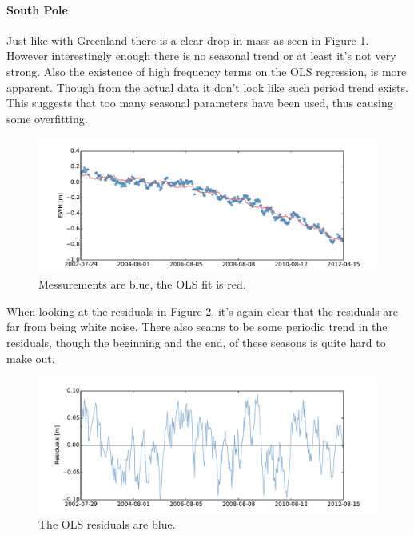 \paragraph{South Pole}

Just like with Greenland there is a clear drop in mass as seen in Figure \ref{fig:ols-selected-1-fit}. However interestingly enough there is no seasonal trend or at least it's not very strong. Also the existence of high frequency terms on the OLS regression, is more apparent. Though from the actual data it don't look like such period trend exists. This suggests that too many seasonal parameters have been used, thus causing some overfitting.
\begin{figure}[H]
	\centering
	\includegraphics[width=\textwidth]{figures/ols-selected-1-fit}
	\caption{Messurements are blue, the OLS fit is red.}
	\label{fig:ols-selected-1-fit}
\end{figure}

When looking at the residuals in Figure \ref{fig:ols-selected-1-residual}, it's again clear that the residuals are far from being white noise. There also seams to be some periodic trend in the residuals, though the beginning and the end, of these seasons is quite hard to make out. 

\begin{figure}[H]
	\centering
	\includegraphics[width=\textwidth]{figures/ols-selected-1-residual}
	\caption{The OLS residuals are blue.}
	\label{fig:ols-selected-1-residual}
\end{figure}

